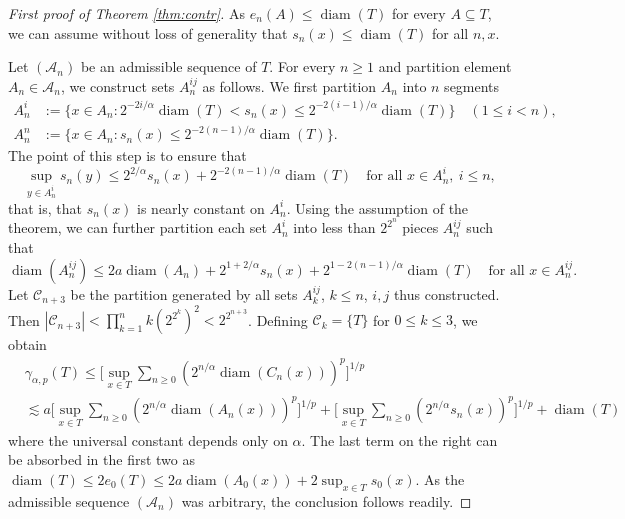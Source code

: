 \documentclass[10pt,reqno]{amsart}
\theoremstyle{definition}
\numberwithin{equation}{section}
\numberwithin{figure}{section}
\numberwithin{table}{section}
\newcommand{\diam}{\mathop{\mathrm{diam}}}
\begin{document}
\begin{proof}[First proof of Theorem \ref{thm:contr}]
As $e_n(A)\le \diam(T)$ for every $A\subseteq T$, we can assume without 
loss of generality that $s_n(x)\le\diam(T)$ for all $n,x$.

Let $(\mathcal{A}_n)$ be an admissible sequence of $T$. For every $n\ge 1$
and partition element $A_n\in\mathcal{A}_n$, we construct sets $A_n^{ij}$ 
as follows. We first partition $A_n$ into $n$ segments
\begin{align*}
	A_n^i &:= \{x\in A_n:2^{-2i/\alpha}\diam(T)<s_n(x)\le 
	2^{-2(i-1)/\alpha}\diam(T)\} \quad(1\le i<n),\\
	A_n^n &:= \{x\in A_n:s_n(x) \le 2^{-2(n-1)/\alpha}\diam(T)\}.
\end{align*}
The point of this step is to ensure that
$$
	\sup_{y\in A_n^i}s_n(y) \le 
	2^{2/\alpha}s_n(x)+2^{-2(n-1)/\alpha}\diam(T)
	\quad\mbox{for all }x\in A_n^i, ~i\le n,
$$
that is, that $s_n(x)$ is nearly constant on $A_n^i$.
Using the assumption of the theorem, we can further partition each set 
$A_n^i$ into less than $2^{2^n}$ pieces $A_n^{ij}$ such that
$$
	\diam(A_n^{ij}) \le 2a\diam(A_n) +
	2^{1+2/\alpha}s_n(x) +
	2^{1-2(n-1)/\alpha}\diam(T)
	\quad\mbox{for all }x\in A_n^{ij}.
$$
Let $\mathcal{C}_{n+3}$ be the partition generated by all sets
$A_k^{ij}$, $k\le n$, $i,j$ thus constructed. Then
$|\mathcal{C}_{n+3}|<\prod_{k=1}^n k(2^{2^k})^2<2^{2^{n+3}}$.
Defining $\mathcal{C}_k=\{T\}$ for $0\le k\le 3$, we obtain 
\begin{align*}
	&\gamma_{\alpha,p}(T) \le
	\Bigg[
	\sup_{x\in T}
	\sum_{n\ge 0}(2^{n/\alpha}\diam(C_n(x)))^p\Bigg]^{1/p} \\
	&\lesssim
	a
	\Bigg[
	\sup_{x\in T}
	\sum_{n\ge 0}(2^{n/\alpha}\diam(A_n(x)))^p\Bigg]^{1/p}
	+
	\Bigg[
	\sup_{x\in T}
	\sum_{n\ge 0}(2^{n/\alpha}s_n(x))^p\Bigg]^{1/p}
	+
	\diam(T)
\end{align*}
where the universal constant depends only on $\alpha$. The last term on 
the right can be absorbed in the first two as
$\diam(T)\le 2e_0(T) \le 2a\diam(A_0(x))+2\sup_{x\in T}s_0(x)$.
As the admissible sequence $(\mathcal{A}_n)$ was arbitrary, the conclusion  
follows readily.
\end{proof}
\end{document}
